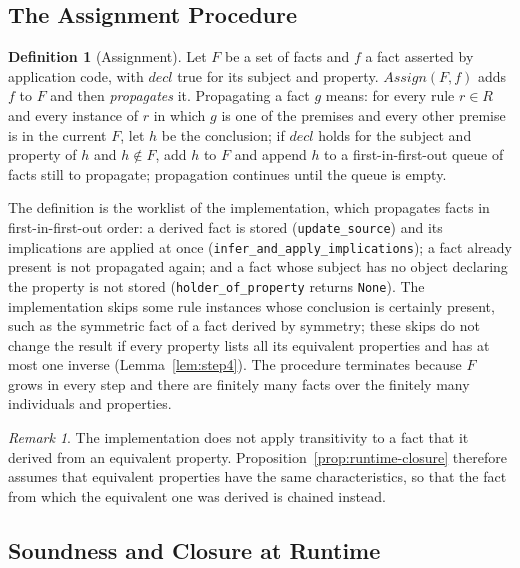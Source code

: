 \documentclass[11pt, a4paper]{article}
\theoremstyle{plain}
\theoremstyle{definition}
\newtheorem{definition}[theorem]{Definition}
\theoremstyle{remark}
\newtheorem{remark}[theorem]{Remark}
\begin{document}
\subsection{The Assignment Procedure}

\begin{definition}[Assignment]
\label{def:assign}
Let $F$ be a set of facts and $f$ a fact asserted by application code, with $\mathit{decl}$
true for its subject and property. $\mathit{Assign}(F,f)$ adds $f$ to $F$ and then
\emph{propagates} it. Propagating a fact $g$ means: for every rule $r\in R$ and every
instance of $r$ in which $g$ is one of the premises and every other premise is in the current
$F$, let $h$ be the conclusion; if $\mathit{decl}$ holds for the subject and property of $h$ and
$h\notin F$, add $h$ to $F$ and append $h$ to a first-in-first-out queue of facts still to propagate; propagation continues until the queue is empty.
\end{definition}

The definition is the worklist of the implementation, which propagates facts in first-in-first-out order: a derived fact is stored
(\texttt{update\_source}) and its implications are applied at once
(\texttt{infer\_and\_apply\_implications}); a fact already present is not propagated again;
and a fact whose subject has no object declaring the property is not stored
(\texttt{holder\_of\_property} returns \texttt{None}). The implementation skips some rule
instances whose conclusion is certainly present, such as the symmetric fact of a fact derived by
symmetry; these skips do not change the result if every property lists all its equivalent properties and has at most one inverse (Lemma~\ref{lem:step4}). The procedure terminates because $F$ grows in
every step and there are finitely many facts over the finitely many individuals and properties.

\begin{remark}
The implementation does not apply transitivity to a fact that it derived from an equivalent
property. Proposition~\ref{prop:runtime-closure} therefore assumes that equivalent properties
have the same characteristics, so that the fact from which the equivalent one was derived is
chained instead.
\end{remark}

\subsection{Soundness and Closure at Runtime}
\end{document}
